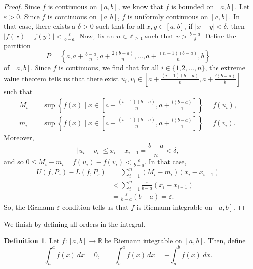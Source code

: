 \documentclass[a4paper, openany]{memoir}
\theoremstyle{definition}
\newtheorem{definition}{Definition}[section]
\theoremstyle{plain}
\begin{document}
\begin{proof}
Since $f$ is continuous on $[a, b]$, we know that $f$ is bounded on $[a, b]$. Let $\varepsilon > 0$. Since $f$ is continuous on $[a, b]$, $f$ is uniformly continuous on $[a, b]$. In that case, there exists a $\delta > 0$ such that for all $x, y \in [a, b]$, if $|x - y| < \delta$, then $|f(x) - f(y)| < \frac{\varepsilon}{b - a}$. Now, fix an $n \in \mathbb{Z}_{\geqslant 1}$ such that $n > \frac{b - a}{\delta}$. Define the partition
\[P = \left\{a, a + \tfrac{b - a}{n}, a + \tfrac{2(b - a)}{n}, \dots, a + \tfrac{(n - 1)(b - a)}{n}, b\right\}\]
of $[a, b]$. Since $f$ is continuous, we find that for all $i \in \{1, 2, \dots, n\}$, the extreme value theorem tells us that there exist $u_i, v_i \in [a + \frac{(i-1)(b - a)}{n}, a + \frac{i(b-a)}{b}]$ such that 
\begin{align*}
    M_i &= \sup \left\{f(x) \mid x \in [a + \tfrac{(i-1)(b-a)}{n}, a + \tfrac{i(b-a)}{n}]\right\} = f(u_i), \\
    m_i &= \sup \left\{f(x) \mid x \in [a + \tfrac{(i-1)(b-a)}{n}, a + \tfrac{i(b-a)}{n}]\right\} = f(v_i).
\end{align*}
Moreover, 
\[|u_i - v_i| \leqslant x_i - x_{i-1} = \frac{b - a}{n} < \delta,\]
and so $0 \leqslant M_i - m_i = f(u_i) - f(v_i) < \frac{\varepsilon}{b - a}$. In that case,
\begin{align*}
    U(f, P_\varepsilon) - L(f, P_\varepsilon) &= \sum_{i=1}^n (M_i - m_i)(x_i - x_{i-1}) \\
    &< \sum_{i=1}^n \frac{\varepsilon}{b - a} (x_i - x_{i-1}) \\
    &= \frac{\varepsilon}{b - a}(b - a) = \varepsilon.
\end{align*}
So, the Riemann $\varepsilon$-condition tells us that $f$ is Riemann integrable on $[a, b]$.
\end{proof}
We finish by defining all orders in the integral.
\begin{definition}
Let $f: [a, b] \to \mathbb{R}$ be Riemann integrable on $[a, b]$. Then, define
\[\int_a^a f(x) \ dx = 0, \qquad \int_b^a f(x) \ dx= -\int_a^b f(x) \ dx.\]
\end{definition}

\newpage
\end{document}
